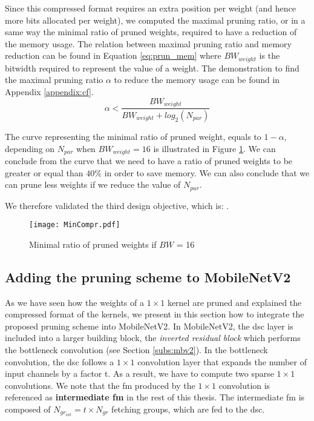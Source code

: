 Since this compressed format requires an extra position per weight (and hence more bits allocated per weight), we computed the maximal pruning ratio, or in a same way the minimal ratio of pruned weights, required to have a reduction of the memory usage. The relation between maximal pruning ratio and memory reduction can be found in Equation \eqref{eq:prun_mem} where $BW_{weight}$ is the bitwidth required to represent the value of a weight. The demonstration to find the maximal pruning ratio $\alpha$ to reduce the memory usage can be found in Appendix \ref{appendix:cf}.
%
\begin{equation}
    \alpha < \frac{BW_{weight}}{ BW_{weight} + log_2(N_{par})}
    \label{eq:prun_mem}
\end{equation}

The curve representing the minimal ratio of pruned weight, equals to $1 - \alpha$, depending on $N_{par}$ when $BW_{weight} = 16$ is illustrated in Figure \ref{fig:prun_mem}. We can conclude from the curve that we need to have a ratio of pruned weights to be greater or equal than $40\%$ in order to save memory. We can also conclude that we can prune less weights if we reduce the value of $N_{par}$. 

We therefore validated the third design objective, which is: \textbf{}.
%
\begin{figure}[H]
    \centering
    \texttt{[image: MinCompr.pdf]}
    \caption{Minimal ratio of pruned weights if $BW$ = 16}
    \label{fig:prun_mem}
\end{figure}
%
\subsection{Adding the pruning scheme to MobileNetV2} \label{subsec:mbnv2-pr}
%
As we have seen how the weights of a $1 \times 1$ kernel are pruned and explained the compressed format of the kernels, we present in this section how to integrate the proposed pruning scheme into MobileNetV2. In MobileNetV2, the \acrshort{dsc} layer is included into a larger building block, the \textit{inverted residual block} which performs the bottleneck convolution (see Section \ref{subs:mbv2}). In the bottleneck convolution, the \acrshort{dsc} follows a $1 \times 1$ convolution layer that expands the number of input channels by a factor t. As a result, we have to compute two sparse $1 \times 1$ convolutions. We note that the \acrshort{fm} produced by the $1 \times 1$ convolution is referenced as \textbf{intermediate \acrshort{fm}} in the rest of this thesis. The intermediate \acrshort{fm} is composed of $N_{gr_{int}} = t \times N_{gr}$ fetching groups, which are fed to the \acrshort{dsc}.

